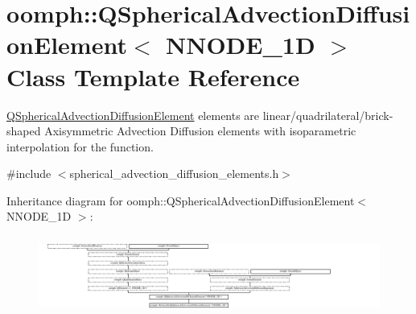 \hypertarget{classoomph_1_1QSphericalAdvectionDiffusionElement}{}\section{oomph\+:\+:Q\+Spherical\+Advection\+Diffusion\+Element$<$ N\+N\+O\+D\+E\+\_\+1D $>$ Class Template Reference}
\label{classoomph_1_1QSphericalAdvectionDiffusionElement}


\hyperlink{classoomph_1_1QSphericalAdvectionDiffusionElement}{Q\+Spherical\+Advection\+Diffusion\+Element} elements are linear/quadrilateral/brick-\/shaped Axisymmetric Advection Diffusion elements with isoparametric interpolation for the function.  




{\ttfamily \#include $<$spherical\+\_\+advection\+\_\+diffusion\+\_\+elements.\+h$>$}

Inheritance diagram for oomph\+:\+:Q\+Spherical\+Advection\+Diffusion\+Element$<$ N\+N\+O\+D\+E\+\_\+1D $>$\+:\begin{figure}[H]
\begin{center}
\leavevmode
\includegraphics[height=2.604651cm]{classoomph_1_1QSphericalAdvectionDiffusionElement}
\end{center}
\end{figure}
